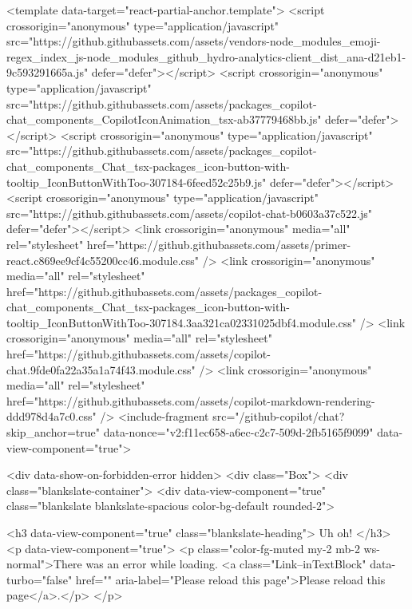      <template data-target="react-partial-anchor.template">
        <script crossorigin="anonymous" type="application/javascript" src="https://github.githubassets.com/assets/vendors-node_modules_emoji-regex_index_js-node_modules_github_hydro-analytics-client_dist_ana-d21eb1-9c593291665a.js" defer="defer"></script>
<script crossorigin="anonymous" type="application/javascript" src="https://github.githubassets.com/assets/packages_copilot-chat_components_CopilotIconAnimation_tsx-ab37779468bb.js" defer="defer"></script>
<script crossorigin="anonymous" type="application/javascript" src="https://github.githubassets.com/assets/packages_copilot-chat_components_Chat_tsx-packages_icon-button-with-tooltip_IconButtonWithToo-307184-6feed52c25b9.js" defer="defer"></script>
<script crossorigin="anonymous" type="application/javascript" src="https://github.githubassets.com/assets/copilot-chat-b0603a37c522.js" defer="defer"></script>
<link crossorigin="anonymous" media="all" rel="stylesheet" href="https://github.githubassets.com/assets/primer-react.c869ee9cf4c55200cc46.module.css" />
<link crossorigin="anonymous" media="all" rel="stylesheet" href="https://github.githubassets.com/assets/packages_copilot-chat_components_Chat_tsx-packages_icon-button-with-tooltip_IconButtonWithToo-307184.3aa321ca02331025dbf4.module.css" />
<link crossorigin="anonymous" media="all" rel="stylesheet" href="https://github.githubassets.com/assets/copilot-chat.9fde0fa22a35a1a74f43.module.css" />
        <link crossorigin="anonymous" media="all" rel="stylesheet" href="https://github.githubassets.com/assets/copilot-markdown-rendering-ddd978d4a7c0.css" />
        <include-fragment src="/github-copilot/chat?skip_anchor=true" data-nonce="v2:f11ec658-a6ec-c2c7-509d-2fb5165f9099" data-view-component="true">
  
  <div data-show-on-forbidden-error hidden>
    <div class="Box">
  <div class="blankslate-container">
    <div data-view-component="true" class="blankslate blankslate-spacious color-bg-default rounded-2">
      

      <h3 data-view-component="true" class="blankslate-heading">        Uh oh!
</h3>
      <p data-view-component="true">        <p class="color-fg-muted my-2 mb-2 ws-normal">There was an error while loading. <a class="Link--inTextBlock" data-turbo="false" href="" aria-label="Please reload this page">Please reload this page</a>.</p>
</p>

